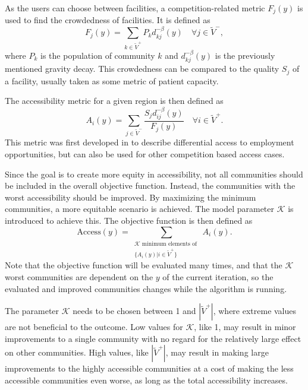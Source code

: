 As the users can choose between facilities, a competition-related metric $F_j(y)$ is used to find the crowdedness of facilities. It is defined as
\begin{equation*}
    F_j(y) = \sum_{k\in \tilde V^+} P_k d_{kj}^{-\beta}(y) \quad \forall j\in \tilde V^-,
\end{equation*}
where $P_k$ is the population of community $k$ and $d_{kj}^{-\beta}(y)$ is the previously mentioned gravity decay. This crowdedness can be compared to the quality $S_j$ of a facility, usually taken as some metric of patient capacity.

The accessibility metric for a given region is then defined as
\begin{equation*}
    A_i(y) = \sum_{j\in\tilde V^-} \frac{S_j d_{ij}^{-\beta}(y)}{F_j(y)}\quad \forall i \in \tilde V^+.
\end{equation*}
This metric was first developed in \cite{weibull} to describe differential access to employment opportunities, but can also be used for other competition based access cases.

\newcommand{\K}{\mathcal{K}}

Since the goal is to create more equity in accessibility, not all communities should be included in the overall objective function. Instead, the communities with the worst accessibility should be improved. By maximizing the minimum communities, a more equitable scenario is achieved. The model parameter $\K$ is introduced to achieve this. The objective function is then defined as
\begin{equation*}
    \text{Access}(y) = \sum_{\substack{\K \text{ minimum elements of }\\ {\{A_i(y)| i\in \tilde V^+\}}}} A_i(y).
\end{equation*}
Note that the objective function will be evaluated many times, and that the $\K$ worst communities are dependent on the $y$ of the current iteration, so the evaluated and improved communities changes while the algorithm is running.

The parameter $\K$ needs to be chosen between 1 and $|\tilde V^+|$, where extreme values are not beneficial to the outcome. Low values for $\K$, like 1, may result in minor improvements to a single community with no regard for the relatively large effect on other communities. High values, like $|\tilde V^+|$, may result in making large improvements to the highly accessible communities at a cost of making the less accessible communities even worse, as long as the total accessibility increases.

